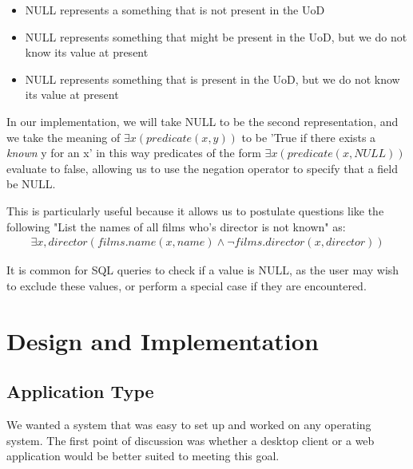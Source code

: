 \documentclass[a4paper, 11pt]{article}
\begin{document}
      \begin{itemize}
        \item NULL represents a something that is not present in the UoD
        \item NULL represents something that might be present in the UoD, but
          we do not know its value at present
        \item NULL represents something that is present in the UoD, but we do
          not know its value at present
      \end{itemize}

    In our implementation, we will take NULL to be the second representation,
    and we take the meaning of \texttt{$\exists x (predicate(x,y))$} to be 
    'True if there exists a \emph{known} y for an x' in this way predicates of
    the form \texttt{$\exists x (predicate(x,NULL))$} evaluate to false, allowing 
    us to use the negation operator to specify that a field be NULL.

    This is particularly useful because it allows us to postulate questions like
    the following "List the names of all films who's director is not known" as:
    \begin{gather}
      \exists x,director(films.name(x,name) \land \lnot films.director(x, director) )
    \end{gather} 
    
    It is common for SQL queries to check if a value is NULL, as the user may
    wish to exclude these values, or perform a special case if they are
    encountered.

\section{Design and Implementation}
  \subsection{Application Type}
    We wanted a system that was easy to set up and worked on any operating
    system. The first point of discussion was whether a desktop client or a web
    application would be better suited to meeting this goal.
\end{document}
